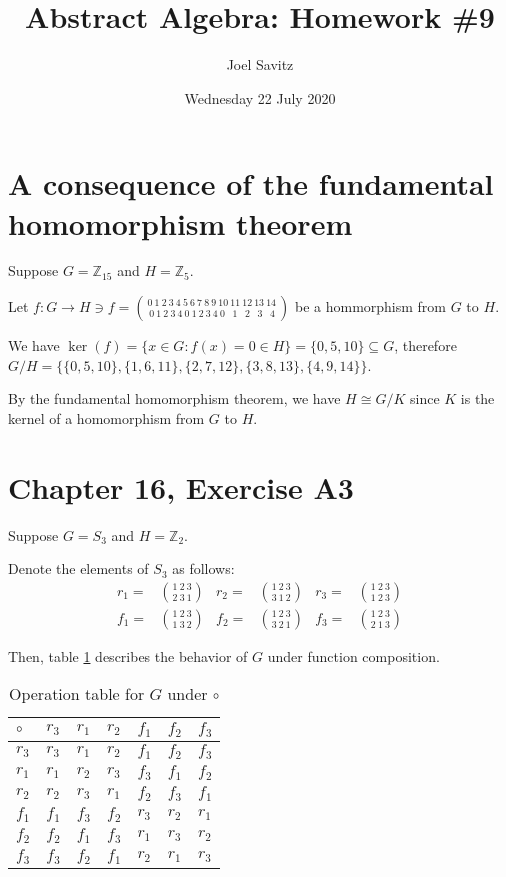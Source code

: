 \documentclass[12pt]{article}
\title{Abstract Algebra: Homework \#9}
\author{Joel Savitz}
\date{Wednesday 22 July 2020}
\newcommand{\ints}{\mathbb{Z}}
\begin{document}
\maketitle

\section{A consequence of the fundamental homomorphism theorem}

Suppose $G = \ints_{15}$ and $H = \ints_5$.

Let $f: G \to H \ni f = \binom{0\ 1\ 2\ 3\ 4\ 5\ 6\ 7\ 8\ 9\ 10\ 11\ 12\ 13\ 14}{\; 0\ 1\ 2\ 3\ 4\ 0\ 1\ 2\ 3\ 4\ 0\ \; \; 1\ \; \; 2\ \; \; 3\ \; \; 4\ }$ be a hommorphism from $G$ to $H$.

We have $\ker(f) = \{x \in G: f(x) = 0 \in H \} = \{0, 5, 10\} \subseteq G$,
therefore $G/H = \{ \{0, 5, 10\}, \{1, 6, 11\}, \{2, 7, 12\}, \{3, 8, 13\}, \{4, 9, 14\} \}$.

By the fundamental homomorphism theorem, we have $H \cong G/K$ since $K$ is the kernel of a homomorphism from $G$ to $H$.

\section{Chapter 16, Exercise A3}

Suppose $G = S_3$ and $H = \ints_2$.

Denote the elements of $S_3$ as follows:
\begin{align}
	\label{topperm}
	r_1 = & \binom{1\ 2\ 3}{2\ 3\ 1} &
	r_2 = & \binom{1\ 2\ 3}{3\ 1\ 2} &
	r_3 = & \binom{1\ 2\ 3}{1\ 2\ 3} \\
	\label{botperm}
	f_1 = & \binom{1\ 2\ 3}{1\ 3\ 2} &
	f_2 = & \binom{1\ 2\ 3}{3\ 2\ 1} &
	f_3 = & \binom{1\ 2\ 3}{2\ 1\ 3}
\end{align}

Then, table \ref{t1} describes the behavior of $G$ under function composition.

\begin{table}[!ht] 
\begin{tabular}{l|llllll}
	$\circ$ & $r_3$ & $r_1$ & $r_2$ & $f_1$ & $f_2$ & $f_3$	\\ \hline
	$r_3$ & $r_3$ & $r_1$ & $r_2$ & $f_1$ & $f_2$ & $f_3$   \\
	$r_1$ & $r_1$ & $r_2$ & $r_3$ & $f_3$ & $f_1$ & $f_2$ 	\\
	$r_2$ & $r_2$ & $r_3$ & $r_1$ & $f_2$ & $f_3$ & $f_1$ 	\\
	$f_1$ & $f_1$ & $f_3$ & $f_2$ & $r_3$ & $r_2$ & $r_1$ 	\\
	$f_2$ & $f_2$ & $f_1$ & $f_3$ & $r_1$ & $r_3$ & $r_2$ 	\\
	$f_3$ & $f_3$ & $f_2$ & $f_1$ & $r_2$ & $r_1$ & $r_3$	\\
\end{tabular}
\centering
\caption{Operation table for $G$ under $\circ$}
\label{t1}
\end{table}
\end{document}
